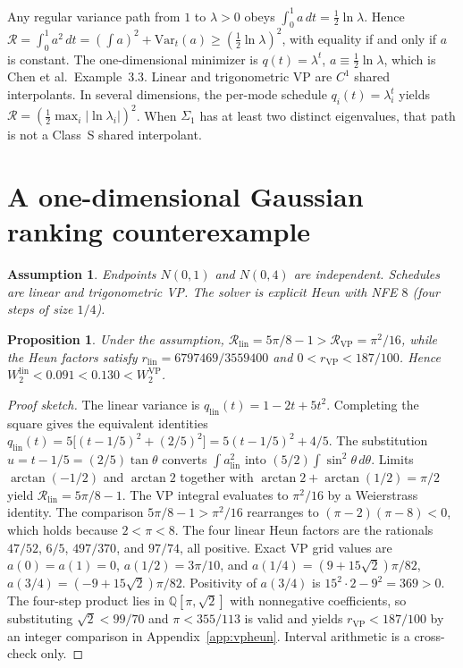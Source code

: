 \documentclass{article}
\newtheorem{proposition}{Proposition}
\newtheorem{assumption}{Assumption}
\newcommand{\wtwo}{W_2}
\newcommand{\cR}{\mathcal{R}}
\begin{document}
Any regular variance path from $1$ to $\lambda>0$ obeys
$\int_0^1 a\,dt=\tfrac12\ln\lambda$. Hence
$\cR=\int_0^1 a^2\,dt=(\int a)^2+\mathrm{Var}_t(a)\ge(\tfrac12\ln\lambda)^2$,
with equality if and only if $a$ is constant. The one-dimensional
minimizer is $q(t)=\lambda^t$, $a\equiv\tfrac12\ln\lambda$, which is
Chen et al.\ Example~3.3. Linear and trigonometric VP are $C^1$ shared
interpolants. In several dimensions, the per-mode
schedule $q_i(t)=\lambda_i^t$ yields
$\cR=(\tfrac12\max_i|\ln\lambda_i|)^2$. When $\Sigma_1$ has at least two
distinct eigenvalues, that path is not a Class~S shared interpolant.

\section{A one-dimensional Gaussian ranking counterexample}
\label{sec:scalar}

\begin{assumption}
Endpoints $N(0,1)$ and $N(0,4)$ are independent. Schedules are linear
and trigonometric VP. The solver is explicit Heun with NFE $8$ (four
steps of size $1/4$).
\end{assumption}

\begin{proposition}
\label{prop:scalar}
Under the assumption,
$\cR_{\mathrm{lin}}=5\pi/8-1>\cR_{\mathrm{VP}}=\pi^2/16$, while the
Heun factors satisfy $r_{\mathrm{lin}}=6797469/3559400$ and
$0<r_{\mathrm{VP}}<187/100$. Hence
$\wtwo^{\mathrm{lin}}<0.091<0.130<\wtwo^{\mathrm{VP}}$.
\end{proposition}

\begin{proof}[Proof sketch]
The linear variance is $q_{\mathrm{lin}}(t)=1-2t+5t^2$. Completing the
square gives the equivalent identities
$q_{\mathrm{lin}}(t)=5\bigl[(t-1/5)^2+(2/5)^2\bigr]
=5(t-1/5)^2+4/5$. The substitution $u=t-1/5=(2/5)\tan\theta$ converts
$\int a_{\mathrm{lin}}^2$ into $(5/2)\int\sin^2\theta\,d\theta$. Limits
$\arctan(-1/2)$ and $\arctan 2$ together with
$\arctan 2+\arctan(1/2)=\pi/2$ yield $\cR_{\mathrm{lin}}=5\pi/8-1$.
The VP integral evaluates to $\pi^2/16$ by a Weierstrass identity.
The comparison $5\pi/8-1>\pi^2/16$ rearranges to $(\pi-2)(\pi-8)<0$,
which holds because $2<\pi<8$.
The four linear Heun factors are the rationals $47/52$, $6/5$,
$497/370$, and $97/74$, all positive. Exact VP grid values are
$a(0)=a(1)=0$, $a(1/2)=3\pi/10$, and
$a(1/4)=(9+15\sqrt{2})\pi/82$,
$a(3/4)=(-9+15\sqrt{2})\pi/82$. Positivity of $a(3/4)$ is
$15^2\cdot 2-9^2=369>0$. The four-step product lies in
$\mathbb{Q}[\pi,\sqrt{2}]$ with nonnegative coefficients, so
substituting $\sqrt{2}<99/70$ and $\pi<355/113$ is valid and yields
$r_{\mathrm{VP}}<187/100$ by an integer comparison in
Appendix~\ref{app:vpheun}. Interval arithmetic is a cross-check only.
\end{proof}
\end{document}
